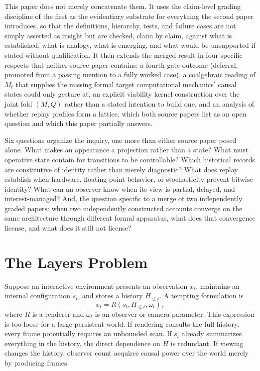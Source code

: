 \documentclass[11pt]{article}
\begin{document}
This paper does not merely concatenate them. It uses the claim-level grading discipline of the first as the evidentiary substrate for everything the second paper introduces, so that the definitions, hierarchy, tests, and failure cases are not simply asserted as insight but are checked, claim by claim, against what is established, what is analogy, what is emerging, and what would be unsupported if stated without qualification. It then extends the merged result in four specific respects that neither source paper contains: a fourth gate outcome (deferral, promoted from a passing mention to a fully worked case), a coalgebraic reading of $M_t$ that supplies the missing formal target computational mechanics' causal states could only gesture at, an explicit viability kernel construction over the joint fold $(M,Q)$ rather than a stated intention to build one, and an analysis of whether replay profiles form a lattice, which both source papers list as an open question and which this paper partially answers.

Six questions organize the inquiry, one more than either source paper posed alone. What makes an appearance a projection rather than a state? What must operative state contain for transitions to be controllable? Which historical records are constitutive of identity rather than merely diagnostic? What does replay establish when hardware, floating-point behavior, or stochasticity prevent bitwise identity? What can an observer know when its view is partial, delayed, and interest-managed? And, the question specific to a merge of two independently graded papers: when two independently constructed accounts converge on the same architecture through different formal apparatus, what does that convergence license, and what does it still not license?

\section{The Layers Problem}
\label{sec:layers-problem}

Suppose an interactive environment presents an observation $x_t$, maintains an internal configuration $s_t$, and stores a history $H_{\le t}$. A tempting formulation is
\[
x_t = R(s_t, H_{\le t}, \omega_t),
\]
where $R$ is a renderer and $\omega_t$ is an observer or camera parameter. This expression is too loose for a large persistent world. If rendering consults the full history, every frame potentially requires an unbounded scan. If $s_t$ already summarizes everything in the history, the direct dependence on $H$ is redundant. If viewing changes the history, observer count acquires causal power over the world merely by producing frames.
\end{document}
